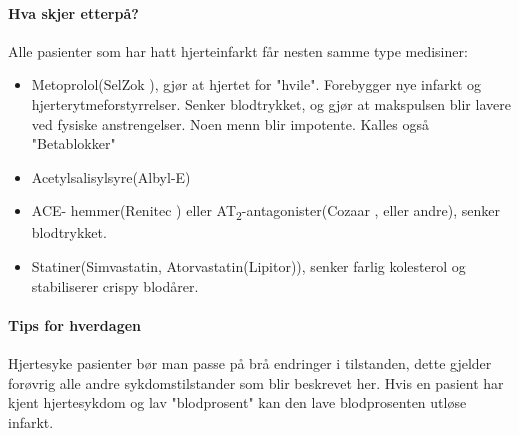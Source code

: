 				\paragraph{Hva skjer etterpå?\\}
					Alle pasienter som har hatt hjerteinfarkt får nesten samme type medisiner:
					\begin{itemize}
						\item Metoprolol(SelZok \textregistered), gjør at hjertet for "hvile". Forebygger nye infarkt og hjerterytmeforstyrrelser. Senker blodtrykket, og gjør at makspulsen blir lavere ved fysiske anstrengelser. Noen menn blir impotente. Kalles også "Betablokker"\\
						\item Acetylsalisylsyre(Albyl-E\textregistered) \\
						\item ACE- hemmer(Renitec \textregistered) eller AT\textsubscript{2}-antagonister(Cozaar \textregistered, eller andre), senker blodtrykket.\\
						\item Statiner(Simvastatin, Atorvastatin(Lipitor\textregistered)), senker farlig kolesterol og stabiliserer crispy blodårer.\\
					\end{itemize}
				\paragraph{Tips for hverdagen\\}
					Hjertesyke pasienter bør man passe på brå endringer i tilstanden, dette gjelder forøvrig alle andre sykdomstilstander som blir beskrevet her. Hvis en pasient har kjent hjertesykdom og lav "blodprosent" kan den lave blodprosenten utløse infarkt.

